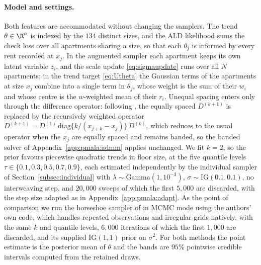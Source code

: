 \paragraph{Model and settings.} Both features are accommodated without changing the samplers. The trend $\theta \in \R^{n}$ is indexed by the $134$ distinct sizes, and the ALD likelihood sums the check loss over all apartments sharing a size, so that each $\theta_j$ is informed by every rent recorded at $x_j$. In the augmented sampler each apartment keeps its own latent variable $z_i$, and the scale update \eqref{eq:sigmaupdate} runs over all $N$ apartments; in the trend target \eqref{eq:Utheta} the Gaussian terms of the apartments at size $x_j$ combine into a single term in $\theta_j$, whose weight is the sum of their $w_i$ and whose centre is the $w$-weighted mean of their $r_i$. Unequal spacing enters only through the difference operator: following \citet{onizuka2024fast}, the equally spaced $D^{(k+1)}$ is replaced by the recursively weighted operator $D^{(k+1)} = D^{(1)}\,\mathrm{diag}\{k/(x_{j+k} - x_j)\}\,D^{(k)}$, which reduces to the usual operator when the $x_j$ are equally spaced and remains banded, so the banded solver of Appendix~\ref{app:pmala:admm} applies unchanged. We fit $k = 2$, so the prior favours piecewise quadratic trends in floor size, at the five quantile levels $\tau \in \{0.1, 0.3, 0.5, 0.7, 0.9\}$, each estimated independently by the individual sampler of Section~\ref{subsec:individual} with $\lambda \sim \mathrm{Gamma}(1, 10^{-3})$, $\sigma \sim \mathrm{IG}(0.1, 0.1)$, no interweaving step, and $20{,}000$ sweeps of which the first $5{,}000$ are discarded, with the step size adapted as in Appendix~\ref{app:pmala:adapt}. As the point of comparison we run the horseshoe sampler of \citet{onizuka2024fast} in MCMC mode using the authors' own code, which handles repeated observations and irregular grids natively, with the same $k$ and quantile levels, $6{,}000$ iterations of which the first $1{,}000$ are discarded, and its supplied $\mathrm{IG}(1,1)$ prior on $\sigma^2$. For both methods the point estimate is the posterior mean of $\theta$ and the bands are $95\%$ pointwise credible intervals computed from the retained draws.

